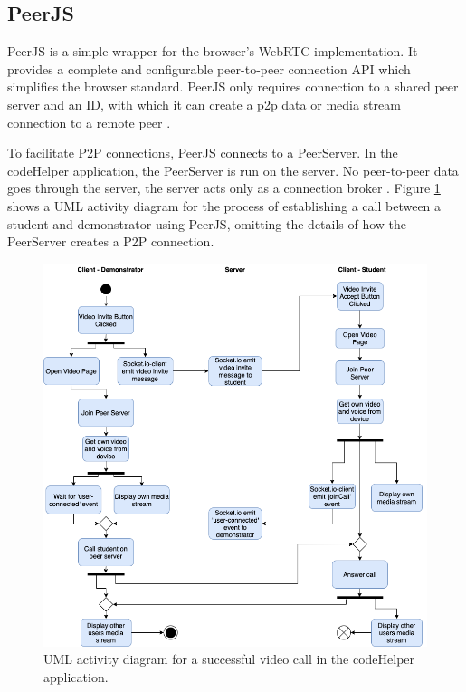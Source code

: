 \subsection{PeerJS}

PeerJS is a simple wrapper for the browser's WebRTC implementation. It provides a complete and configurable peer-to-peer connection API which simplifies the browser standard. PeerJS only requires connection to a shared peer server and an ID, with which it can create a \gls{p2p} data or media stream connection to a remote peer \cite{peerjs}.

To facilitate P2P connections, PeerJS connects to a PeerServer. In the codeHelper application, the PeerServer is run on the server. No peer-to-peer data goes through the server, the server acts only as a connection broker \cite{peerjs}. Figure \ref{fig:videoactivity} shows a UML activity diagram for the process of establishing a call between a student and demonstrator using PeerJS, omitting the details of how the PeerServer creates a P2P connection.

\begin{figure}[H]
    \centering
    \includegraphics[width=\textwidth]{8implementation/images/activityVideoCall.png}
    \caption{UML activity diagram for a successful video call in the codeHelper application.}
    \label{fig:videoactivity}
\end{figure}

